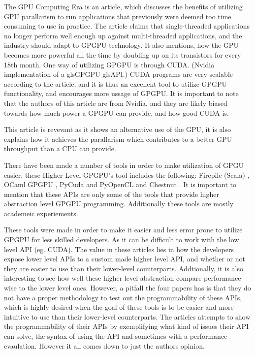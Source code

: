 The GPU Computing Era \cite{gpu_computing_era} is an article, which discusses the benefits of utilizing \gls{GPU} parallarism to run applications that previously were deemed too time consuming to use in practice. 
The article claims that single-threaded applications no longer perform well enough up against multi-threaded applications, and the industry should adapt to GP\gls{GPU} technology. 
It also mentions, how the \gls{GPU} becomes more powerful all the time by doubling up on its transistors for every 18th month. 
One way of utilizing \gls{GPGPU} is through CUDA. (Nvidia implementation of a gls{GPGPU} gls{API}.)
CUDA programs are very scalable according to the article, and it is thus an excellent tool to utilize \gls{GPGPU} functionality, and encourages more ussage of \gls{GPGPU}.
It is important to note that the authors of this article are from Nvidia, and they are likely biased towards how much power a \gls{GPGPU} can provide, and how good CUDA is. 

This article is revevant as it shows an alternative use of the \gls{GPU}, it is also explains how it achieves the parallarism which contributes to a better \gls{GPU} throughput than a \gls{CPU} can provide.

There have been made a number of tools in order to make utilization of GPGU easier, these Higher Level GP\gls{GPU}'s tool includes the following: Firepile (Scala) \cite{2011_firepile}, OCaml GP\gls{GPU} \cite{bourgoin_2017_high}, PyCuda and PyOpenCL \cite{2012_pycuda_pyopencl} and Chestnut \cite{stromme_2012_chestnut}.
It is important to mention that these \glspl{API} are only some of the tools that provide higher abstraction level GPGPU programming. 
Additionally these tools are mostly academeic experiements.

These tools were made in order to make it easier and less error prone to utilize GP\gls{GPU} for less skilled developers.
As it can be difficult to work with the low level \gls{API} (eg. CUDA).
The value in these articles lies in how the developers expose lower level \glspl{API} to a custom made higher level \gls{API}, and whether or not they are easier to use than their lower-level counterparts. 
Addtionally, it is also interesting to see how well these higher level abstraction compare performance-wise to the lower level ones. 
However, a pitfall the four papers has is that they do not have a proper methodology to test out the programmability of these \glspl{API}, which is highly desired when the goal of these tools is to be easier and more intuitive to use than their lower-level counterparts.
The articles attempts to show the programmability of their \glspl{API} by exemplifying what kind of issues their \gls{API} can solve, the syntax of using the \gls{API} and sometimes with a performance evaulation.
However it all comes down to just the authors opinion.

